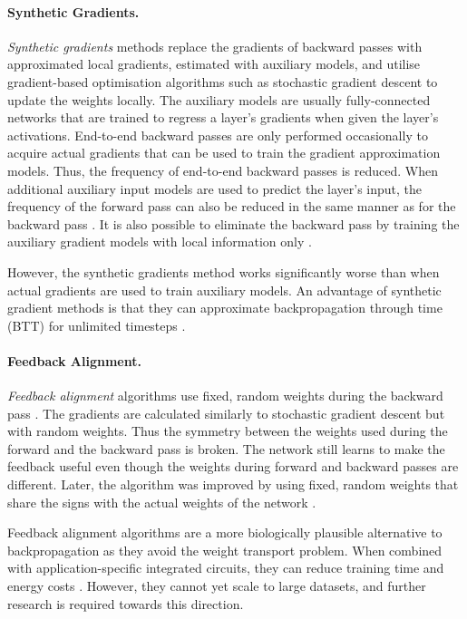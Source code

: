 \paragraph{Synthetic Gradients.} \emph{Synthetic gradients} methods  replace the gradients of backward passes with approximated local gradients, estimated with auxiliary models, and utilise gradient-based optimisation algorithms such as stochastic gradient descent to update the weights locally.
The auxiliary models are usually fully-connected networks that are trained to regress a layer's gradients when given the layer's activations.
End-to-end backward passes are only performed occasionally to acquire actual gradients that can be used to train the gradient approximation models.
Thus, the frequency of end-to-end backward passes is reduced.
When additional auxiliary input models are used to predict the layer's input, the frequency of the forward pass can also be reduced in the same manner as for the backward pass \cite{jaderberg_decoupled_2017}.
It is also possible to eliminate the backward pass by training the auxiliary gradient models with local information only .

However, the synthetic gradients method works significantly worse than when actual gradients are used to train auxiliary models.
An advantage of synthetic gradient methods is that they can approximate backpropagation through time (BTT) for unlimited timesteps \cite{jaderberg_decoupled_2017}.

\paragraph{Feedback Alignment.} \emph{Feedback alignment} algorithms use fixed, random weights during the backward pass .
The gradients are calculated similarly to stochastic gradient descent but with random weights.
Thus the symmetry between the weights used during the forward and the backward pass is broken.
The network still learns to make the feedback useful even though the weights during forward and backward passes are different. 
Later, the algorithm was improved by using fixed, random weights that share the signs with the actual weights of the network .

Feedback alignment algorithms are a more biologically plausible alternative to backpropagation as they avoid the weight transport problem.
When combined with application-specific integrated circuits, they can reduce training time and energy costs \cite{lillicrap_random_2016}.
However, they cannot yet scale to large datasets, and further research is required towards this direction.

